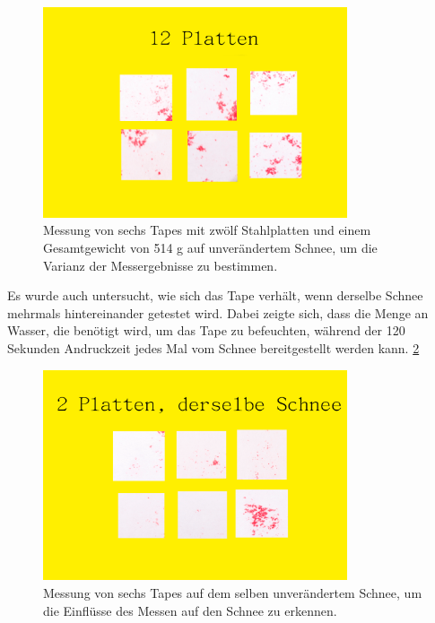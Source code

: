 \begin{figure}[H]
    \centering
    \includegraphics[width=0.8\textwidth]{Bilder/12Platten.png}
    \caption{Messung von sechs Tapes mit  zwölf Stahlplatten und einem Gesamtgewicht von 514 g auf unverändertem Schnee, um die Varianz der Messergebnisse zu bestimmen.} 
    \label{fig:12Palt}
\end{figure}

\newpage
Es wurde auch untersucht, wie sich das Tape verhält, wenn derselbe Schnee mehrmals hintereinander getestet wird. Dabei zeigte sich, dass die Menge an Wasser, die benötigt wird, um das Tape zu befeuchten, während der 120 Sekunden Andruckzeit jedes Mal vom Schnee bereitgestellt werden kann. \ref{fig:aufbauTitlis}


\begin{figure}[H]
    \centering
    \includegraphics[width=0.8\textwidth]{Bilder/2PlattenSelberSchnee.png}
    \caption{Messung von sechs Tapes auf dem selben unverändertem Schnee, um die Einflüsse des Messen auf den Schnee zu erkennen.} 
    \label{fig:aufbauTitlis}
\end{figure}
